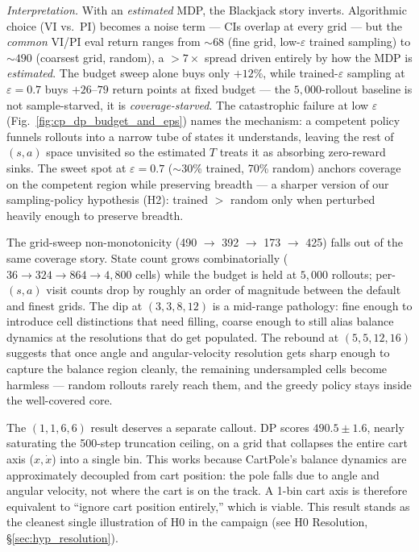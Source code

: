 \documentclass[conference]{IEEEtran}
\begin{document}
\emph{Interpretation.} With an \emph{estimated} MDP, the Blackjack
story inverts. Algorithmic choice (VI vs.\ PI) becomes a noise
term --- CIs overlap at every grid --- but the
\emph{common} VI/PI eval return ranges from $\sim$$68$ (fine grid,
low-$\varepsilon$ trained sampling) to $\sim$$490$ (coarsest grid,
random), a $>$$7\times$ spread driven entirely by how the MDP is
\emph{estimated}. The budget sweep alone buys only $+12\%$, while
trained-$\varepsilon$ sampling at $\varepsilon = 0.7$ buys
$+26$--$79$ return points at fixed budget --- the $5{,}000$-rollout
baseline is not sample-starved, it is \emph{coverage-starved}. The
catastrophic failure at low $\varepsilon$ (Fig.~\ref{fig:cp_dp_budget_and_eps})
names the mechanism: a competent policy funnels rollouts into a
narrow tube of states it understands, leaving the rest of
$(s, a)$ space unvisited so the estimated $T$ treats it as
absorbing zero-reward sinks. The sweet spot at $\varepsilon = 0.7$
($\sim$30\% trained, 70\% random) anchors coverage on the
competent region while preserving breadth --- a sharper version
of our sampling-policy hypothesis (H2): trained $>$ random only
when perturbed heavily enough to preserve breadth.

The grid-sweep non-monotonicity (490 $\to$ 392 $\to$ 173 $\to$ 425)
falls out of the same coverage story. State count grows
combinatorially ($36 \to 324 \to 864 \to 4{,}800$ cells) while the
budget is held at $5{,}000$ rollouts; per-$(s, a)$ visit counts
drop by roughly an order of magnitude between the default and
finest grids. The dip at $(3,3,8,12)$ is a mid-range pathology:
fine enough to introduce cell distinctions that need filling,
coarse enough to still alias balance dynamics at the resolutions
that do get populated. The rebound at $(5,5,12,16)$ suggests that
once angle and angular-velocity resolution gets sharp enough to
capture the balance region cleanly, the remaining undersampled
cells become harmless --- random rollouts rarely reach them, and
the greedy policy stays inside the well-covered core.

The $(1,1,6,6)$ result deserves a separate callout. DP scores
$\mathbf{490.5 \pm 1.6}$, nearly saturating the 500-step truncation
ceiling, on a grid that collapses the entire cart axis ($x,
\dot{x}$) into a single bin. This works because CartPole's
balance dynamics are approximately decoupled from cart position:
the pole falls due to angle and angular velocity, not where the
cart is on the track. A 1-bin cart axis is therefore equivalent
to ``ignore cart position entirely,'' which is viable. This result
stands as the cleanest single illustration of H0 in the campaign
(see H0 Resolution, \S\ref{sec:hyp_resolution}).
\end{document}
